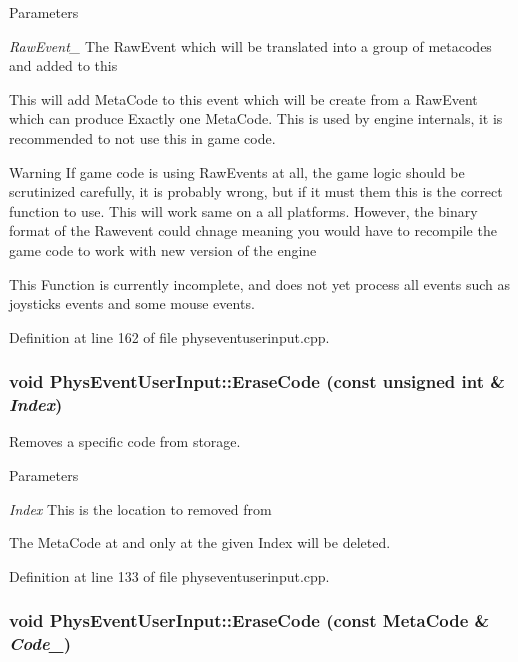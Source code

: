 \begin{DoxyParams}{Parameters}
\item[{\em RawEvent\_\-}]The RawEvent which will be translated into a group of metacodes and added to this\end{DoxyParams}
This will add MetaCode to this event which will be create from a RawEvent which can produce Exactly one MetaCode. This is used by engine internals, it is recommended to not use this in game code. \begin{DoxyWarning}{Warning}
If game code is using RawEvents at all, the game logic should be scrutinized carefully, it is probably wrong, but if it must them this is the correct function to use. This will work same on a all platforms. However, the binary format of the Rawevent could chnage meaning you would have to recompile the game code to work with new version of the engine \par
 This Function is currently incomplete, and does not yet process all events such as joysticks events and some mouse events. 
\end{DoxyWarning}


Definition at line 162 of file physeventuserinput.cpp.

\hypertarget{classPhysEventUserInput_a8cbbee3c2be3bd12746ad442fce526e4}{
\subsubsection[{EraseCode}]{\setlength{\rightskip}{0pt plus 5cm}void PhysEventUserInput::EraseCode (const unsigned int \& {\em Index})}}
\label{dc/d0e/classPhysEventUserInput_a8cbbee3c2be3bd12746ad442fce526e4}


Removes a specific code from storage. 


\begin{DoxyParams}{Parameters}
\item[{\em Index}]This is the location to removed from\end{DoxyParams}
The MetaCode at and only at the given Index will be deleted. 

Definition at line 133 of file physeventuserinput.cpp.

\hypertarget{classPhysEventUserInput_a1dbd2996770df334fba9f67d9bb4ffa0}{
\subsubsection[{EraseCode}]{\setlength{\rightskip}{0pt plus 5cm}void PhysEventUserInput::EraseCode (const {\bf MetaCode} \& {\em Code\_\-})}}
\label{dc/d0e/classPhysEventUserInput_a1dbd2996770df334fba9f67d9bb4ffa0}


